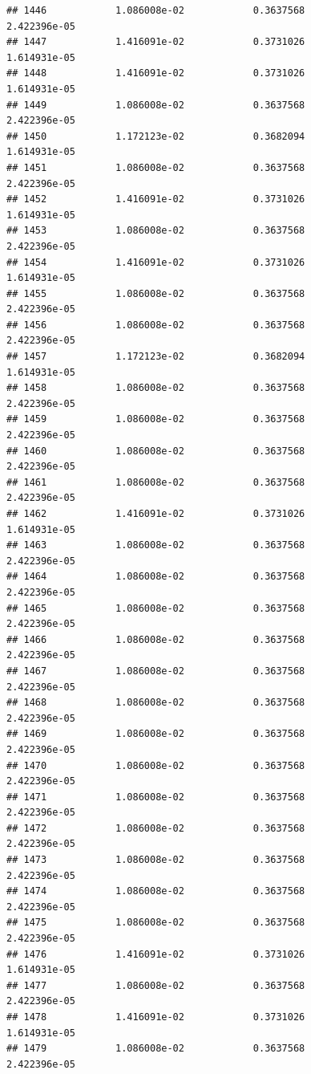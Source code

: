 \documentclass[
]{article}
\begin{document}
\begin{verbatim}
## 1446            1.086008e-02            0.3637568            2.422396e-05
## 1447            1.416091e-02            0.3731026            1.614931e-05
## 1448            1.416091e-02            0.3731026            1.614931e-05
## 1449            1.086008e-02            0.3637568            2.422396e-05
## 1450            1.172123e-02            0.3682094            1.614931e-05
## 1451            1.086008e-02            0.3637568            2.422396e-05
## 1452            1.416091e-02            0.3731026            1.614931e-05
## 1453            1.086008e-02            0.3637568            2.422396e-05
## 1454            1.416091e-02            0.3731026            1.614931e-05
## 1455            1.086008e-02            0.3637568            2.422396e-05
## 1456            1.086008e-02            0.3637568            2.422396e-05
## 1457            1.172123e-02            0.3682094            1.614931e-05
## 1458            1.086008e-02            0.3637568            2.422396e-05
## 1459            1.086008e-02            0.3637568            2.422396e-05
## 1460            1.086008e-02            0.3637568            2.422396e-05
## 1461            1.086008e-02            0.3637568            2.422396e-05
## 1462            1.416091e-02            0.3731026            1.614931e-05
## 1463            1.086008e-02            0.3637568            2.422396e-05
## 1464            1.086008e-02            0.3637568            2.422396e-05
## 1465            1.086008e-02            0.3637568            2.422396e-05
## 1466            1.086008e-02            0.3637568            2.422396e-05
## 1467            1.086008e-02            0.3637568            2.422396e-05
## 1468            1.086008e-02            0.3637568            2.422396e-05
## 1469            1.086008e-02            0.3637568            2.422396e-05
## 1470            1.086008e-02            0.3637568            2.422396e-05
## 1471            1.086008e-02            0.3637568            2.422396e-05
## 1472            1.086008e-02            0.3637568            2.422396e-05
## 1473            1.086008e-02            0.3637568            2.422396e-05
## 1474            1.086008e-02            0.3637568            2.422396e-05
## 1475            1.086008e-02            0.3637568            2.422396e-05
## 1476            1.416091e-02            0.3731026            1.614931e-05
## 1477            1.086008e-02            0.3637568            2.422396e-05
## 1478            1.416091e-02            0.3731026            1.614931e-05
## 1479            1.086008e-02            0.3637568            2.422396e-05

\end{verbatim}
\end{document}
